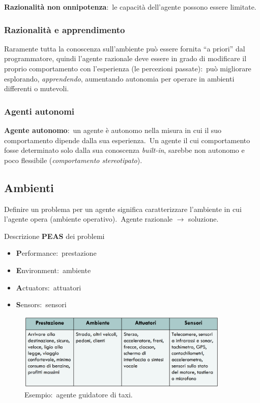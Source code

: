 \noindent\textbf{Razionalità non onnipotenza}:\ le capacità dell'agente possono essere limitate.

\subsubsection{Razionalità e apprendimento}

Raramente tutta la conoscenza sull'ambiente può essere fornita ``a priori'' dal programmatore, quindi l'agente razionale deve essere in grado di modificare il proprio comportamento con l'esperienza (le percezioni passate):\ può migliorare esplorando, \textit{apprendendo}, aumentando autonomia per operare in ambienti differenti o mutevoli.

\subsubsection{Agenti autonomi}

\textbf{Agente autonomo}:\ un agente è autonomo nella misura in cui il suo comportamento dipende dalla sua esperienza.\
Un agente il cui comportamento fosse determinato solo dalla sua conoscenza \textit{built-in}, sarebbe non autonomo e poco flessibile (\textit{comportamento stereotipato}).

\subsection{Ambienti}
Definire un problema per un agente significa caratterizzare l'ambiente in cui l'agente opera (ambiente operativo).\
Agente razionale $\rightarrow$ soluzione.\

Descrizione \textbf{PEAS} dei problemi
\begin{itemize}
	\item \textbf{P}erformance:\ prestazione
	\item \textbf{E}nvironment:\ ambiente
	\item \textbf{A}ctuators:\ attuatori
	\item \textbf{S}ensors:\ sensori
\end{itemize}

\begin{figure}[H]
	\centering
	\includegraphics[width=0.9\textwidth]{immagini/Ambiente_Taxi.png}
	\caption*{Esempio:\ agente guidatore di taxi.}
\end{figure}

